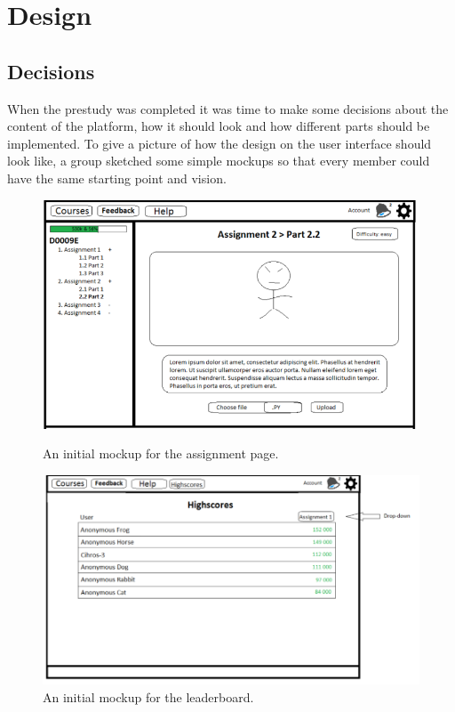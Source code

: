 \chapter{Design}
\section{Decisions} 
When the prestudy was completed it was time to make some decisions about the content of the platform, how it should look and how different parts should be implemented. To give a picture of how the design on the user interface should look like, a group sketched some simple mockups
so that every member could have the same starting point and vision. 

\begin{figure}[H]
  \centering
  \begin{minipage}[b]{0.7\textwidth}
    \includegraphics[width=\textwidth]{img/mockup1.png}
    \caption{An initial mockup for the assignment page.}
  \end{minipage}
  \hfill
  \begin{minipage}[b]{0.7\textwidth}
    \includegraphics[width=\textwidth]{img/mockup2.png}
    \caption{An initial mockup for the leaderboard.}
  \end{minipage}
\end{figure}

